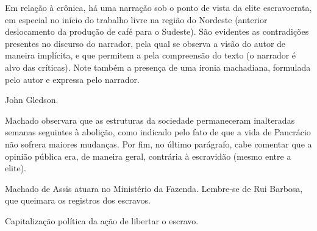 Em relação à crônica, há uma narração sob o ponto de vista da elite escravocrata, em especial no início do trabalho livre na região do Nordeste (anterior deslocamento da produção de café para o Sudeste). São evidentes as contradições presentes no discurso do narrador, pela qual se observa a visão do autor de maneira implícita, e que permitem a pela compreensão do texto (o narrador é alvo das críticas). Note também a presença de uma ironia machadiana, formulada pelo autor e expressa pelo narrador.

John Gledson.

Machado observara que as estruturas da sociedade permaneceram inalteradas semanas seguintes à abolição, como indicado pelo fato de que a vida de Pancrácio não sofrera maiores mudanças. Por fim, no último parágrafo, cabe comentar que a opinião pública era, de maneira geral, contrária à escravidão (mesmo entre a elite).

Machado de Assis atuara no Ministério da Fazenda. Lembre-se de Rui Barbosa, que queimara os registros dos escravos.

Capitalização política da ação de libertar o escravo. 